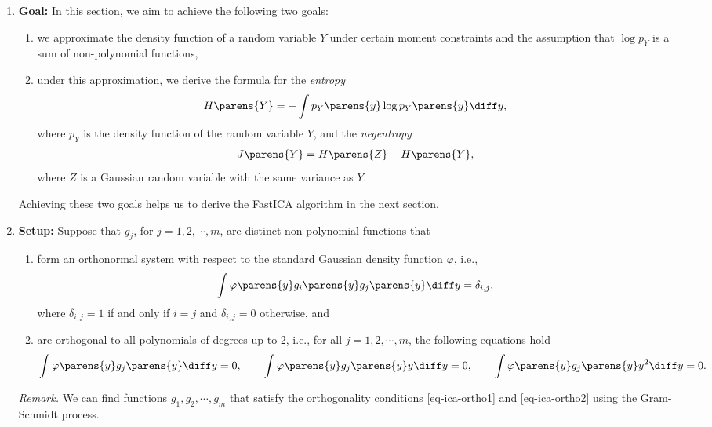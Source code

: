 \documentclass[12pt]{article}
\begin{document}
\begin{enumerate}[label=\textbf{\arabic*.}]

	\item \textbf{Goal:} In this section, we aim to achieve the following two goals: 
	\begin{enumerate}
		\item we approximate the density function of a random variable $Y$ under certain moment constraints and the assumption that $\log p_Y$ is a sum of non-polynomial functions, 
		\item under this approximation, we derive the formula for the \emph{entropy} 
		\begin{align}
			H \parens{Y} = - \int p_Y \parens{y} \log p_Y \parens{y} \diff y, 
		\end{align}
		where $p_Y$ is the density function of the random variable $Y$, and the \emph{negentropy}  
		\begin{align}
			J \parens{Y} = H \parens{Z} - H \parens{Y}, 
		\end{align}
		where $Z$ is a Gaussian random variable with the same variance as $Y$. 
	\end{enumerate}
	Achieving these two goals helps us to derive the FastICA algorithm in the next section. 
	
	\item \textbf{Setup:} Suppose that $g_j$, for $j = 1, 2, \cdots, m$, are distinct non-polynomial functions that 
	\begin{enumerate}
		\item form an orthonormal system with respect to the standard Gaussian density function $\varphi$, i.e., 
		\begin{align}\label{eq-ica-ortho1}
			\int \varphi \parens{y} g_i \parens{y} g_j \parens{y} \diff y = \delta_{i, j}, 
		\end{align}
		where $\delta_{i, j} = 1$ if and only if $i = j$ and $\delta_{i, j} = 0$ otherwise, and 
		\item are orthogonal to all polynomials of degrees up to 2, i.e., for all $j = 1, 2, \cdots, m$, the following equations hold
		\begin{equation}\label{eq-ica-ortho2}
			\begin{aligned}
				\int \varphi \parens{y} g_j \parens{y} \diff y = 0, \qquad
				\int \varphi \parens{y} g_j \parens{y} y \diff y = 0, \qquad
				\int \varphi \parens{y} g_j \parens{y} y^2 \diff y = 0. 
			\end{aligned}
		\end{equation}
	\end{enumerate}
	\textit{Remark.} We can find functions $g_1, g_2, \cdots, g_m$ that satisfy the orthogonality conditions \eqref{eq-ica-ortho1} and \eqref{eq-ica-ortho2} using the Gram-Schmidt process. 
	

\end{enumerate}
\end{document}
